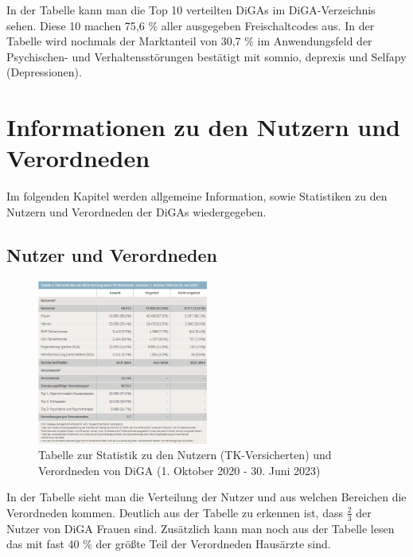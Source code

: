 \documentclass{article}
\begin{document}
			In der Tabelle kann man die Top 10 verteilten DiGAs im DiGA-Verzeichnis sehen. Diese 10 machen 75,6 \% aller ausgegeben Freischaltcodes aus. In der Tabelle wird nochmals der Marktanteil von 30,7 \% im Anwendungsfeld der Psychischen- und Verhaltensstörungen bestätigt mit somnio, deprexis und Selfapy (Depressionen).  
	
	\section{Informationen zu den Nutzern und Verordneden}
		Im folgenden Kapitel werden allgemeine Information, sowie Statistiken zu den Nutzern und Verordneden der DiGAs wiedergegeben.
		\subsection{Nutzer und Verordneden}
			\begin{figure}[htbp]
				\centering
				\includegraphics[width=0.5\textwidth]{./grafiken/tabelle_nutzung_versicherte_diga}
				\caption[Statistik zu den Nutzern (TK-Versicherten) und Verordneden von DiGA]{Tabelle zur Statistik zu den Nutzern (TK-Versicherten) und Verordneden von DiGA (1. Oktober 2020 - 30. Juni 2023)}
				\label{Tab-nutzung-versicherte-diga}
			\end{figure}
			In der Tabelle sieht man die Verteilung der Nutzer und aus welchen Bereichen die Verordneden kommen. Deutlich aus der Tabelle zu erkennen ist, dass $\frac{2}{3}$ der Nutzer von DiGA Frauen sind. Zusätzlich kann man noch aus der Tabelle lesen das mit fast 40 \% der größte Teil der Verordneden Hausärzte sind.\par
			
\end{document}
